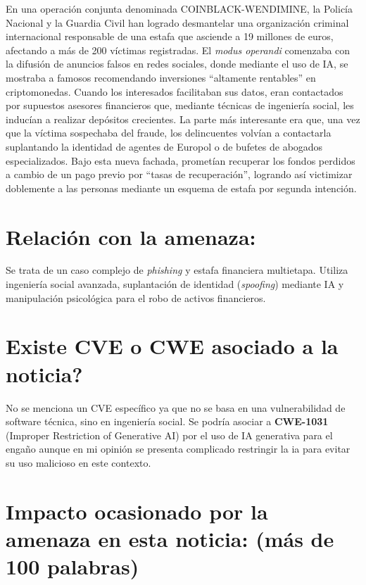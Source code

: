     En una operación conjunta denominada COINBLACK-WENDIMINE, la Policía Nacional y 
    la Guardia Civil han logrado desmantelar una organización criminal internacional 
    responsable de una estafa que asciende a 19 millones de euros, afectando a más de 
    200 víctimas registradas. El \textit{modus operandi} comenzaba con la difusión de 
    anuncios falsos en redes sociales, donde mediante el uso de IA, se mostraba a famosos 
    recomendando inversiones ``altamente rentables'' en criptomonedas. Cuando los interesados
     facilitaban sus datos, eran contactados por supuestos asesores financieros que, 
     mediante técnicas de ingeniería social, les inducían a realizar depósitos crecientes. 
     La parte más interesante era que, una vez que la víctima sospechaba del fraude, 
     los delincuentes volvían a contactarla suplantando la identidad de agentes de 
     Europol o de bufetes de abogados especializados. Bajo esta nueva fachada, 
     prometían recuperar los fondos perdidos a cambio de un pago previo por 
     ``tasas de recuperación'', logrando así victimizar doblemente a las personas mediante 
     un esquema de estafa por segunda intención.


    \section{Relación con la amenaza:}

    Se trata de un caso complejo de \textit{phishing} y estafa financiera multietapa. Utiliza ingeniería social avanzada, suplantación de identidad (\textit{spoofing}) mediante IA y manipulación psicológica para el robo de activos financieros.

    \section{\textquestiondown Existe CVE o CWE asociado a la noticia?}

    No se menciona un CVE específico ya que no se basa en una vulnerabilidad de software técnica, sino en ingeniería social. Se podría asociar a \textbf{CWE-1031} (Improper Restriction of Generative AI) por el uso de IA generativa para el engaño aunque en mi opinión se presenta complicado restringir la ia para evitar su uso malicioso en este contexto.

    \section{Impacto ocasionado por la amenaza en esta noticia: (más de 100 palabras)}

